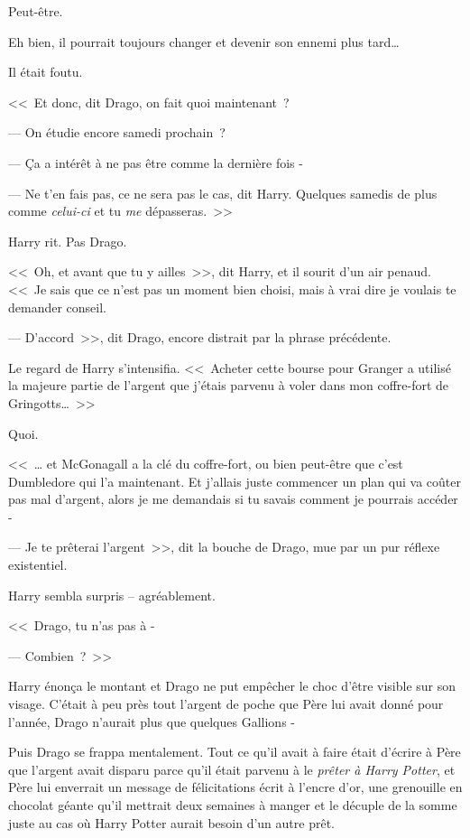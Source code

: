 Peut-être.

Eh bien, il pourrait toujours changer et devenir son ennemi plus tard…

Il était foutu.

<<~Et donc, dit Drago, on fait quoi maintenant~?

--- On étudie encore samedi prochain~?

--- Ça a intérêt à ne pas être comme la dernière fois -

--- Ne t'en fais pas, ce ne sera pas le cas, dit Harry. Quelques samedis de plus comme \emph{celui-ci} et tu \emph{me} dépasseras.~>>

Harry rit. Pas Drago.

<<~Oh, et avant que tu y ailles~>>, dit Harry, et il sourit d'un air penaud. <<~Je sais que ce n'est pas un moment bien choisi, mais à vrai dire je voulais te demander conseil.

--- D'accord~>>, dit Drago, encore distrait par la phrase précédente.

Le regard de Harry s'intensifia. <<~Acheter cette bourse pour Granger a utilisé la majeure partie de l'argent que j'étais parvenu à voler dans mon coffre-fort de Gringotts…~>>

Quoi.

<<~… et McGonagall a la clé du coffre-fort, ou bien peut-être que c'est Dumbledore qui l'a maintenant. Et j'allais juste commencer un plan qui va coûter pas mal d'argent, alors je me demandais si tu savais comment je pourrais accéder -

--- Je te prêterai l'argent~>>, dit la bouche de Drago, mue par un pur réflexe existentiel.

Harry sembla surpris -- agréablement.

<<~Drago, tu n'as pas à -

--- Combien~?~>>

Harry énonça le montant et Drago ne put empêcher le choc d'être visible sur son visage. C'était à peu près tout l'argent de poche que Père lui avait donné pour l'année, Drago n'aurait plus que quelques Gallions -

Puis Drago se frappa mentalement. Tout ce qu'il avait à faire était d'écrire à Père que l'argent avait disparu parce qu'il était parvenu à le \emph{prêter à Harry Potter}, et Père lui enverrait un message de félicitations écrit à l'encre d'or, une grenouille en chocolat géante qu'il mettrait deux semaines à manger et le décuple de la somme juste au cas où Harry Potter aurait besoin d'un autre prêt.

